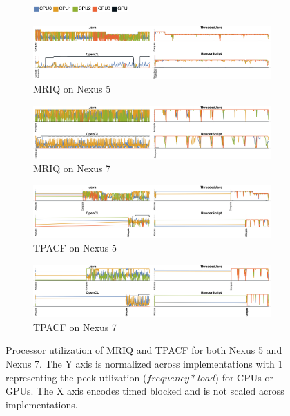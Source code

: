\begin{figure}[ht]
  \centering

  \begin{subfigure}[b]{\textwidth}
          \centering
          \includegraphics[width=0.4\textwidth]{data/load_legend.pdf}
  \end{subfigure}

  \begin{subfigure}[b]{0.9\textwidth}
      \centering
      \includegraphics[width=\textwidth]{data/load_mriq_nexus5.pdf}
      \caption{MRIQ on Nexus 5}
      \label{fig:MRIQ5}
  \end{subfigure}
  \begin{subfigure}[b]{0.9\textwidth}
      \centering
      \includegraphics[width=\textwidth]{data/load_mriq_nexus7.pdf}
      \caption{MRIQ on Nexus 7}
      \label{fig:MRIQ7}
  \end{subfigure}

  \begin{subfigure}[b]{0.9\textwidth}
      \centering
      \includegraphics[width=\textwidth]{data/load_tpacf_nexus5.pdf}
      \caption{TPACF on Nexus 5}
      \label{fig:TPACF5}
  \end{subfigure}
  \begin{subfigure}[b]{0.9\textwidth}
      \centering
      \includegraphics[width=\textwidth]{data/load_tpacf_nexus7.pdf}
      \caption{TPACF on Nexus 7}
      \label{fig:TPACF7}
  \end{subfigure}

  \caption{Processor utilization of MRIQ and TPACF for both Nexus 5 and Nexus 7. The Y axis is normalized across implementations with $1$ representing the peek utlization ($frequency*load$) for CPUs or GPUs. The X axis encodes timed blocked and is not scaled across implementations.}
\end{figure}
